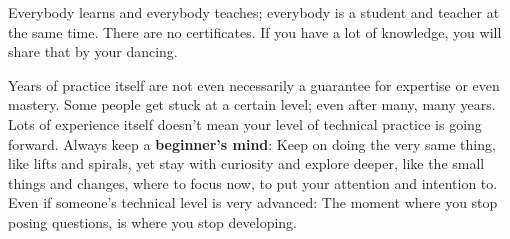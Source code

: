 Everybody learns and everybody teaches; everybody is a student and teacher at the same time.
There are no certificates.
If you have a lot of knowledge, you will share that by your dancing.

Years of practice itself are not even necessarily a guarantee for expertise or even mastery.
Some people get stuck at a certain level; even after many, many years.
Lots of experience itself doesn't mean your level of technical practice is going forward.
Always keep a \textbf{beginner's mind}: Keep on doing the very same thing, like lifts and spirals, yet stay with curiosity and explore deeper, like the small things and changes, where to focus now, to put your attention and intention to.
Even if someone's technical level is very advanced: The moment where you stop posing questions, is where you stop developing.

